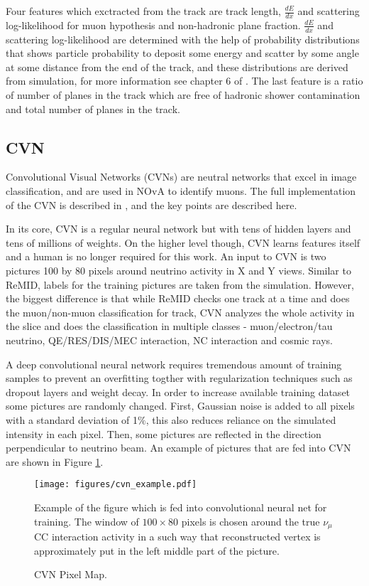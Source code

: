 Four features which exctracted from the track are track length, $\frac{dE}{dx}$ and scattering 
log-likelihood for muon hypothesis and non-hadronic plane fraction. $\frac{dE}{dx}$ and scattering log-likelihood 
are determined with the help of probability distributions that shows particle probability to deposit some energy 
and scatter by some angle at some distance from the end of the track, and these distributions are derived from 
simulation, for more information see chapter 6 of \cite{Nick}. The last feature is a ratio of number of planes in 
the track which are free of hadronic shower contamination and total number of planes in the track. 

\subsection{CVN}
Convolutional Visual Networks (CVNs) are neutral networks that excel in image classification, and are used in
NOvA to identify muons. The full implementation of the CVN is described in \cite{CVN}, and the key points are
described here.

In its core, CVN is a regular neural network but with tens of hidden layers and tens of millions of weights. 
On the higher level though, CVN learns features itself and a human is no longer required for this work.
An input to CVN is two pictures 100 by 80 pixels around neutrino activity in X and Y views. Similar to ReMID, labels 
for the training pictures are taken from the simulation. However, the biggest difference is that while ReMID checks
one track at a time and does the muon/non-muon classification for track, CVN analyzes the whole activity in the 
slice and does the classification in multiple classes - muon/electron/tau neutrino, QE/RES/DIS/MEC interaction, 
NC interaction and cosmic rays.

A deep convolutional neural network requires tremendous amount of training samples to prevent an overfitting togther 
with regularization techniques such as dropout layers \cite{dropout} and weight decay. In order to increase available 
training dataset some pictures are randomly changed. First, Gaussian noise is added to all pixels with a standard 
deviation of 1$\%$, this also reduces reliance on the simulated intensity in each pixel. Then, some pictures 
are reflected in the direction perpendicular to neutrino beam. An example of pictures that are fed into CVN are
shown in Figure \ref{fig:cvn_example}.
\begin{figure}[h]
\texttt{[image: figures/cvn\_example.pdf]}\\%
\caption{CVN Pixel Map.}
{Example of the figure which is fed into convolutional neural net for training. The window of $100\times80$ 
pixels is chosen around the true $\nu_\mu$ CC interaction activity in a such way that reconstructed vertex is 
approximately put in the left middle part of the picture.}
\label{fig:cvn_example}
\end{figure}

